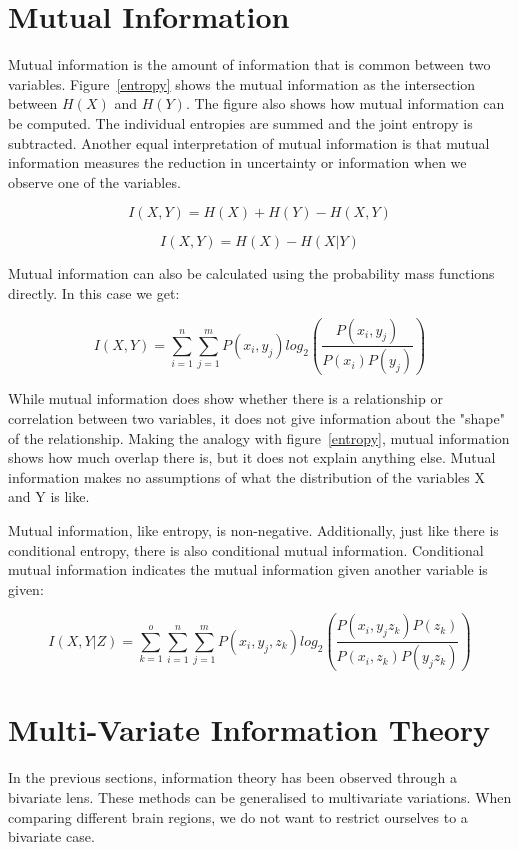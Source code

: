 \section{Mutual Information}
Mutual information is the amount of information that is common between two variables. Figure~\ref{entropy} shows the mutual information as the intersection between $H(X)$ and $H(Y)$. The figure also shows how mutual information can be computed. The individual entropies are summed and the joint entropy is subtracted. Another equal interpretation of mutual information is that mutual information measures the reduction in uncertainty or information when we observe one of the variables.

\begin{equation}
I(X,Y) = H(X) + H(Y) - H(X,Y)
\end{equation}

\begin{equation}
I(X,Y) = H(X) - H(X|Y)
\end{equation}

Mutual information can also be calculated using the probability mass functions directly. In this case we get:

\begin{equation}
I(X,Y) = \sum_{i=1}^{n}\sum_{j=1}^{m}P(x_i, y_j)log_2(\frac{P(x_i, y_j)}{P(x_i)P(y_j)})
\end{equation}
    
While mutual information does show whether there is a relationship or correlation between two variables, it does not give information about the "shape" of the relationship. Making the analogy with figure~\ref{entropy}, mutual information shows how much overlap there is, but it does not explain anything else. Mutual information makes no assumptions of what the distribution of the variables X and Y is like. 

Mutual information, like entropy, is non-negative. Additionally, just like there is conditional entropy, there is also conditional mutual information. Conditional mutual information indicates the mutual information given another variable is given:

\begin{equation}
I(X,Y|Z) = \sum_{k=1}^{o}\sum_{i=1}^{n}\sum_{j=1}^{m}P(x_i, y_j, z_k)log_2(\frac{P(x_i, y_j z_k)P(z_k)}{P(x_i, z_k)P(y_j z_k)})
\end{equation}

\section{Multi-Variate Information Theory}
In the previous sections, information theory has been observed through a bivariate lens. These methods can be generalised to multivariate variations. When comparing different brain regions, we do not want to restrict ourselves to a bivariate case.

